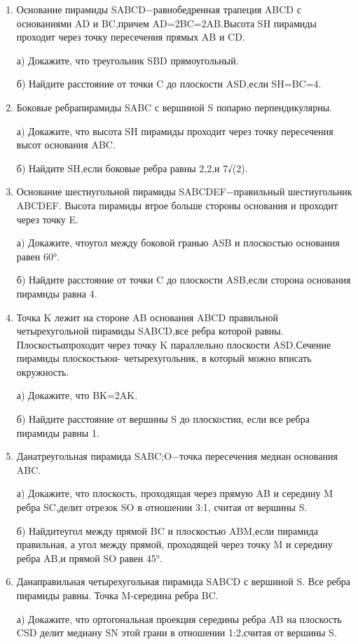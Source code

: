 \documentclass[12pt]{article}
\begin{document}
\begin{enumerate}
  \par а) Постройтесечение призмы плоскостью A\_1C\_1E.
  \par б) Найдите угол между плоскостью сечения и плоскостью ABC.
  \item Основание пирамиды SABCD−равнобедренная трапеция ABCD с основаниями AD и BC,причем AD=2BC=2AB.Высота SH пирамиды проходит через точку пересечения прямых AB и CD.
  \par а) Докажите, что треугольник SBD прямоугольный.
  \par б) Найдите расстояние от точки C до плоскости ASD,если SH=BC=4.
  \item Боковые ребрапирамиды SABC с вершиной S попарно перпендикулярны.
  \par а) Докажите, что высота SH пирамиды проходит через точку пересечения высот основания ABC.
  \par б) Найдите SH,если боковые ребра равны 2,2,и 7√(2).
  \item Основание шестиугольной пирамиды SABCDEF−правильный шестиугольник ABCDEF. Высота пирамиды втрое больше стороны основания и проходит через точку E.
  \par а) Докажите, чтоугол между боковой гранью ASB и плоскостью основания равен 60°.
  \par б) Найдите расстояние от точки C до плоскости ASB,если сторона основания пирамиды равна 4.
  \item Точка K лежит на стороне AB основания ABCD правильной четырехугольной пирамиды SABCD,все ребра которой равны. Плоскостьαпроходит через точку K параллельно плоскости ASD.Сечение пирамиды плоскостьюα- четырехугольник, в который можно вписать окружность.
  \par а) Докажите, что BK=2AK.
  \par б) Найдите расстояние от вершины S до плоскостиα, если все ребра пирамиды равны 1.
  \item Данатреугольная пирамида SABC;O−точка пересечения медиан основания ABC.
  \par а) Докажите, что плоскость, проходящая через прямую AB и середину M ребра SC,делит отрезок SO в отношении 3:1, считая от вершины S.
  \par б) Найдитеугол между прямой BC и плоскостью ABM,если пирамида правильная, а угол между прямой, проходящей через точку M и середину ребра AB,и прямой SO равен 45°.
  \item Данаправильная четырехугольная пирамида SABCD с вершиной S. Все ребра пирамиды равны. Точка M-середина ребра BC.
  \par а) Докажите, что ортогональная проекция середины ребра AB на плоскость CSD делит медиану SN этой грани в отношении 1:2,считая от вершины S.

\end{enumerate}
\end{document}
